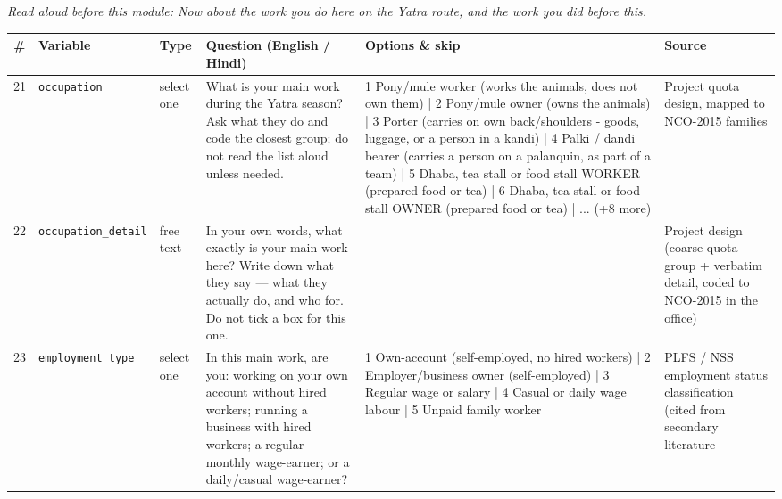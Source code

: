 \documentclass[9pt,a4paper,landscape]{article}
\begin{document}
{\small\itshape Read aloud before this module: Now about the work you do here on the Yatra route, and the work you did before this.}\\[5pt]
\begin{longtable}{@{}p{0.5cm}p{3.3cm}p{1.7cm}p{7.3cm}p{5.6cm}p{5.4cm}@{}}
\toprule \footnotesize\textbf{\#} & \footnotesize\textbf{Variable} & \footnotesize\textbf{Type} & \footnotesize\textbf{Question (English / Hindi)} & \footnotesize\textbf{Options {\&} skip} & \footnotesize\textbf{Source}\\ \midrule
\endhead
\footnotesize 21 & \footnotesize\texttt{occupation} & \scriptsize select one & \footnotesize What is your main work during the Yatra season? Ask what they do and code the closest group; do not read the list aloud unless needed.\par\vspace{1pt}{\footnotesize\color{hdr}{\hifont यात्रा के मौसम में आपका मुख्य काम क्या है?}} & \scriptsize 1 Pony/mule worker (works the animals, does not own them) | 2 Pony/mule owner (owns the animals) | 3 Porter (carries on own back/shoulders - goods, luggage, or a person in a kandi) | 4 Palki / dandi bearer (carries a person on a palanquin, as part of a team) | 5 Dhaba, tea stall or food stall WORKER (prepared food or tea) | 6 Dhaba, tea stall or food stall OWNER (prepared food or tea) | ... (+8 more) & \scriptsize Project quota design, mapped to NCO-2015 families\\
\footnotesize 22 & \footnotesize\texttt{occupation\_detail} & \scriptsize free text & \footnotesize In your own words, what exactly is your main work here? Write down what they say — what they actually do, and who for. Do not tick a box for this one.\par\vspace{1pt}{\footnotesize\color{hdr}{\hifont अपने शब्दों में बताइए, यहाँ आपका मुख्य काम ठीक-ठीक क्या है? आप करते क्या हैं, और किसके लिए?}} & \scriptsize  & \scriptsize Project design (coarse quota group + verbatim detail, coded to NCO-2015 in the office)\\
\footnotesize 23 & \footnotesize\texttt{employment\_type} & \scriptsize select one & \footnotesize In this main work, are you: working on your own account without hired workers; running a business with hired workers; a regular monthly wage-earner; or a daily/casual wage-earner?\par\vspace{1pt}{\footnotesize\color{hdr}{\hifont इस काम में आप क्या हैं: अपना काम खुद करते हैं और कोई नौकर नहीं रखते; अपना काम है और दूसरों को काम पर रखते हैं; महीने की पक्की तनख़्वाह पाते हैं; या दिहाड़ी पर काम करते हैं?}} & \scriptsize 1 Own-account (self-employed, no hired workers) | 2 Employer/business owner (self-employed) | 3 Regular wage or salary | 4 Casual or daily wage labour | 5 Unpaid family worker & \scriptsize PLFS / NSS employment status classification (cited from secondary literature\\

\end{longtable}
\end{document}
